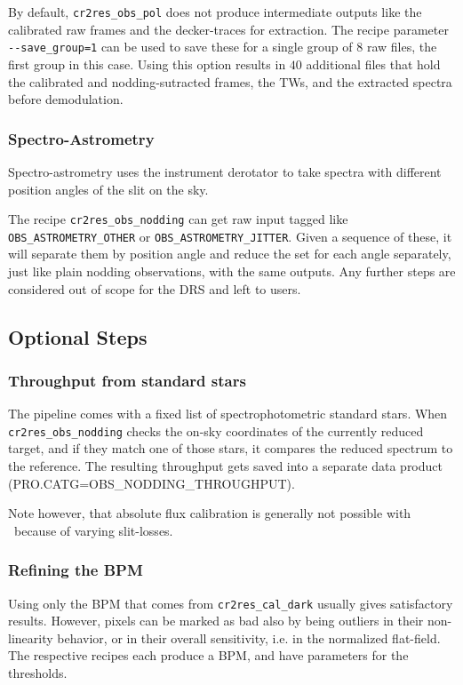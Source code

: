 By default, \verb!cr2res_obs_pol! does not produce intermediate outputs like the
calibrated raw frames and the decker-traces for extraction. The recipe parameter
\verb!--save_group=1! can be used to save these for a single group of $8$ raw
files, the first group in this case. Using this option results in $40$
additional files that hold the calibrated and nodding-sutracted frames, the TWs,
and the extracted spectra before demodulation.

\subsubsection{Spectro-Astrometry}

Spectro-astrometry uses the instrument derotator to take spectra with different
position angles of the slit on the sky.

The recipe \verb!cr2res_obs_nodding! can get raw input tagged like
\verb!OBS_ASTROMETRY_OTHER! or \linebreak\verb!OBS_ASTROMETRY_JITTER!. Given a sequence of
these, it will separate them by position angle and reduce the set for each angle
separately, just like plain nodding observations, with the same outputs. Any
further steps are considered out of scope for the DRS and left to users.

\subsection{Optional Steps}

\subsubsection{Throughput from standard stars}
\label{sec:throughput}
The pipeline comes with a fixed list of spectrophotometric standard stars. When \texttt{cr2res\_obs\_nodding} checks the
on-sky coordinates of the currently reduced target, and if they match one of those stars, it compares the reduced spectrum to the 
reference. The resulting throughput gets saved into a separate
data product (PRO.CATG=OBS\_NODDING\_THROUGHPUT).

Note however, that absolute flux calibration is generally not 
possible with \instrument\ because of varying slit-losses.


\subsubsection{Refining the BPM}
\label{sec:bpmrefine}
Using only the BPM that comes from \texttt{cr2res\_cal\_dark} usually gives
satisfactory results. However, pixels can be marked as bad also by being
outliers in their non-linearity behavior, or in their overall sensitivity, i.e.
in the normalized flat-field. The respective recipes each produce a BPM, and
have parameters for the thresholds.

